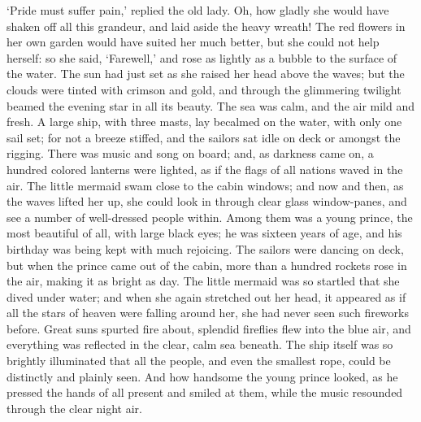 `Pride must suffer pain,' replied the old lady. 
Oh, how gladly she
would have shaken off all this grandeur, and laid aside the heavy
wreath! The red flowers in her own garden would have suited her much
better, but she could not help herself: so she said, `Farewell,' and
rose as lightly as a bubble to the surface of the water. 
The sun had
just set as she raised her head above the waves; but the clouds were
tinted with crimson and gold, and through the glimmering twilight
beamed the evening star in all its beauty. 
The sea was calm, and the
air mild and fresh. 
A large ship, with three masts, lay becalmed on
the water, with only one sail set; for not a breeze stiffed, and the
sailors sat idle on deck or amongst the rigging. 
There was music and
song on board; and, as darkness came on, a hundred colored lanterns
were lighted, as if the flags of all nations waved in the air. 
The
little mermaid swam close to the cabin windows; and now and then, as
the waves lifted her up, she could look in through clear glass
window-panes, and see a number of well-dressed people within. 
Among
them was a young prince, the most beautiful of all, with large black
eyes; he was sixteen years of age, and his birthday was being kept
with much rejoicing. 
The sailors were dancing on deck, but when the
prince came out of the cabin, more than a hundred rockets rose in
the air, making it as bright as day. 
The little mermaid was so
startled that she dived under water; and when she again stretched
out her head, it appeared as if all the stars of heaven were falling
around her, she had never seen such fireworks before. 
Great suns
spurted fire about, splendid fireflies flew into the blue air, and
everything was reflected in the clear, calm sea beneath. 
The ship
itself was so brightly illuminated that all the people, and even the
smallest rope, could be distinctly and plainly seen. 
And how
handsome the young prince looked, as he pressed the hands of all
present and smiled at them, while the music resounded through the
clear night air.

